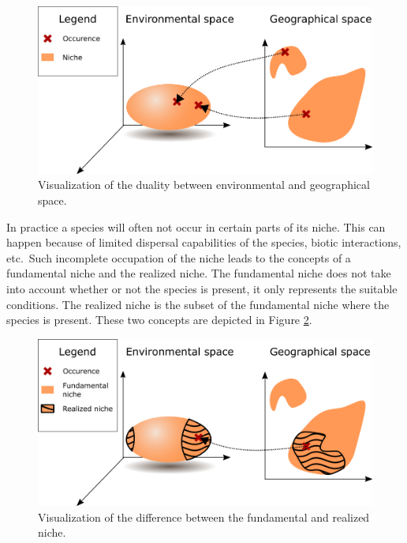 \begin{figure}[!htb]
\includegraphics[scale=0.5]{VectorGraphics/Niche.png}
\caption{\label{fig:chTheEcologicalNicheConcept:Niche}Visualization of the duality between environmental and geographical space.}
\end{figure}

In practice a species will often not occur in certain parts of its niche. This can happen because of limited dispersal capabilities of the species, biotic interactions, etc.\ Such incomplete occupation of the niche leads to the concepts of a fundamental niche and the realized niche. The fundamental niche does not take into account whether or not the species is present, it only represents the suitable conditions. The realized niche is the subset of the fundamental niche where the species is present. These two concepts are depicted in Figure \ref{fig:chTheEcologicalNicheConcept:RealizedNiche}. 
\begin{figure}[!htb]
\includegraphics[scale=0.5]{VectorGraphics/RealizedNiche.png}
\caption{\label{fig:chTheEcologicalNicheConcept:RealizedNiche}Visualization of the difference between the fundamental and realized niche.}
\end{figure}

